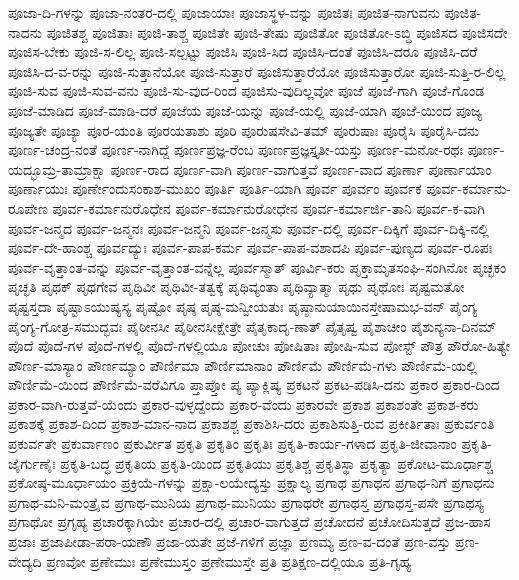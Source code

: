 {ಪೂಜಾ-ದಿ-ಗಳನ್ನು
ಪೂಜಾ-ನಂತರ-ದಲ್ಲಿ
ಪೂಜಾಯಾಃ
ಪೂಜಾಸ್ಥಳ-ವನ್ನು
ಪೂಜಿತಃ
ಪೂಜಿತ-ನಾಗುವನು
ಪೂಜಿತ-ನಾದನು
ಪೂಜಿತಶ್ಚ
ಪೂಜಿತಾಃ
ಪೂಜಿ-ತಾಶ್ಚ
ಪೂಜಿತೇ
ಪೂಜಿ-ತೇಷು
ಪೂಜಿತೋ
ಪೂಜಿತೋ-ಽಬ್ಧಿ
ಪೂಜಿಸದ
ಪೂಜಿಸದೇ
ಪೂಜಿಸ-ಬೇಕು
ಪೂಜಿ-ಸ-ಲಿಲ್ಲ
ಪೂಜಿ-ಸಲ್ಪಟ್ಟು
ಪೂಜಿಸಿ
ಪೂಜಿ-ಸಿದ
ಪೂಜಿಸಿ-ದಂತೆ
ಪೂಜಿಸಿ-ದರೂ
ಪೂಜಿಸಿ-ದರೆ
ಪೂಜಿಸಿ-ದ-ವ-ರನ್ನು
ಪೂಜಿ-ಸುತ್ತಾನೆಯೋ
ಪೂಜಿ-ಸುತ್ತಾರೆ
ಪೂಜಿಸುತ್ತಾರೆಯೋ
ಪೂಜಿಸುತ್ತಾರೋ
ಪೂಜಿ-ಸುತ್ತಿ-ರ-ಲಿಲ್ಲ
ಪೂಜಿ-ಸುವ
ಪೂಜಿ-ಸುವ-ವನು
ಪೂಜಿ-ಸು-ವುದ-ರಿಂದ
ಪೂಜಿಸು-ವುದಿಲ್ಲವೋ
ಪೂಜೆ
ಪೂಜೆ-ಗಾಗಿ
ಪೂಜೆ-ಗೊಂಡ
ಪೂಜೆ-ಮಾಡಿದ
ಪೂಜೆ-ಮಾಡಿ-ದರೆ
ಪೂಜೆಯ
ಪೂಜೆ-ಯನ್ನು
ಪೂಜೆ-ಯಲ್ಲಿ
ಪೂಜೆ-ಯಾಗಿ
ಪೂಜೆ-ಯಿಂದ
ಪೂಜ್ಯ
ಪೂಜ್ಯತೇ
ಪೂಜ್ಯಾ
ಪೂರ-ಯಂತಿ
ಪೂರಯತಾಶು
ಪೂರಿ
ಪೂರುಷಸೇವಿ-ತಮ್
ಪೂರುಷಾಃ
ಪೂರೈಸಿ
ಪೂರೈಸಿ-ದನು
ಪೂರ್ಣ-ಚಂದ್ರ-ನಂತೆ
ಪೂರ್ಣ-ನಾಗಿದ್ದೆ
ಪೂರ್ಣಪ್ರಜ್ಞ-ರೆಂಬ
ಪೂರ್ಣಪ್ರಜ್ಞಸ್ತೃತೀ-ಯಸ್ತು
ಪೂರ್ಣ-ಮನೋ-ರಥಃ
ಪೂರ್ಣ-ಯದ್ಭೂಮ್ರ-ತಾಮ್ರಾಕ್ಷಾ
ಪೂರ್ಣ-ರಾದ
ಪೂರ್ಣ-ವಾಗಿ
ಪೂರ್ಣ-ವಾಗುತ್ತವೆ
ಪೂರ್ಣ-ವಾದ
ಪೂರ್ಣಾ
ಪೂರ್ಣಾಯಾಂ
ಪೂರ್ಣಾಯುಃ
ಪೂರ್ಣೇಂದುಸಂಕಾಶ-ಮುಖಂ
ಪೂರ್ತಿ
ಪೂರ್ತಿ-ಯಾಗಿ
ಪೂರ್ವ
ಪೂರ್ವಂ
ಪೂರ್ವಕ
ಪೂರ್ವ-ಕರ್ಮಾನು-ರೂಪೇಣ
ಪೂರ್ವ-ಕರ್ಮಾನುರೊಧೇನ
ಪೂರ್ವ-ಕರ್ಮಾನುರೋಧೇನ
ಪೂರ್ವ-ಕರ್ಮಾರ್ಜಿ-ತಾನಿ
ಪೂರ್ವ-ಕ-ವಾಗಿ
ಪೂರ್ವ-ಜನ್ಮದ
ಪೂರ್ವ-ಜನ್ಮನಃ
ಪೂರ್ವ-ಜನ್ಮನಿ
ಪೂರ್ವ-ಜನ್ಮಸು
ಪೂರ್ವ-ದಲ್ಲಿ
ಪೂರ್ವ-ದಿಕ್ಕಿಗೆ
ಪೂರ್ವ-ದಿಕ್ಕಿ-ನಲ್ಲಿ
ಪೂರ್ವ-ದೇ-ಹಾಂಶ್ಚ
ಪೂರ್ವದ್ಯುಃ
ಪೂರ್ವ-ಪಾಪ-ಕರ್ಮ
ಪೂರ್ವ-ಪಾಪ-ವಶಾದಪಿ
ಪೂರ್ವ-ಪುಣ್ಯದ
ಪೂರ್ವ-ರೂಪಃ
ಪೂರ್ವ-ವೃತ್ತಾಂತ-ವನ್ನು
ಪೂರ್ವ-ವೃತ್ತಾಂತ-ವನ್ನೆಲ್ಲ
ಪೂರ್ವಸ್ಮಾತ್
ಪೂರ್ವಿ-ಕರು
ಪೃಕ್ತಾಮೃತಸಂಘಿ-ಸಂಗಿನೋ
ಪೃಚ್ಛಕಂ
ಪೃಚ್ಛತಿ
ಪೃಥಕ್
ಪೃಥಗೇವ
ಪೃಥಿವೀ
ಪೃಥಿವೀ-ತತ್ವಕ್ಕೆ
ಪೃಥಿವ್ಯಂತಾ
ಪೃಥಿವ್ಯಾತ್ಮಾ
ಪೃಥು
ಪೃಥೋಃ
ಪೃಷ್ಟಮತೋ
ಪೃಷ್ಟಸ್ತದಾ
ಪೃಷ್ಟಾಽಯುಷ್ಯಸ್ಯ
ಪೃಷ್ಟೋ
ಪೃಷ್ಠ
ಪೃಷ್ಠ-ಮನ್ವೀಯತುಃ
ಪೃಷ್ಠಾನುಯಾಯಿನಸ್ತೇಷಾಮಭ-ವನ್
ಪೈಂಗ್ಯ
ಪೈಂಗ್ಯ-ಗೋತ್ರ-ಸಮುದ್ಭವಃ
ಪೈಠೀನಸೀ
ಪೈಠೀನಸೀಕ್ಷೇತ್ರೇ
ಪೈತೃಕಾದೃ-ಣಾತ್
ಪೈತೃಷ್ವ
ಪೈಶಾಚೀಂ
ಪೈಶುನ್ಯನಾ-ದಿನಮ್
ಪೊದೆ
ಪೊದೆ-ಗಳ
ಪೊದೆ-ಗಳಲ್ಲಿ
ಪೊದೆ-ಗಳಲ್ಲಿಯೂ
ಪೋಚುಃ
ಪೋಷಿತಾಃ
ಪೋಷಿ-ಸುವ
ಪೋಸ್ಟ್
ಪೌತ್ರ
ಪೌರೋ-ಹಿತ್ಯೇ
ಪೌರ್ಣ-ಮಾಸ್ಯಾಂ
ಪೌರ್ಣಮ್ಯಾಂ
ಪೌರ್ಣಿಮಾ
ಪೌರ್ಣಿಮಾನಾಂ
ಪೌರ್ಣಿಮೆ
ಪೌರ್ಣಿಮೆ-ಗಳು
ಪೌರ್ಣಿಮೆ-ಯಲ್ಲಿ
ಪೌರ್ಣಿಮೆ-ಯಿಂದ
ಪೌರ್ಣಿಮೆ-ವರೆವಿಗೂ
ಪ್ತಾಪ್ತೋ
ಪ್ಯ
ಪ್ಯಾಕ್ಲಿಷ್ಯ
ಪ್ರಕಟನೆ
ಪ್ರಕಟ-ಪಡಿಸಿ-ದನು
ಪ್ರಕಾರ
ಪ್ರಕಾರ-ದಿಂದ
ಪ್ರಕಾರ-ವಾಗಿ-ರುತ್ತವೆ-ಯೆಂದು
ಪ್ರಕಾರ-ವುಳ್ಳದ್ದೆಂದು
ಪ್ರಕಾರ-ವೆಂದು
ಪ್ರಕಾರವೇ
ಪ್ರಕಾಶ
ಪ್ರಕಾಶಂತೇ
ಪ್ರಕಾಶ-ಕರು
ಪ್ರಕಾಶಕ್ಕೆ
ಪ್ರಕಾಶ-ದಿಂದ
ಪ್ರಕಾಶ-ಮಾನ-ನಾದ
ಪ್ರಕಾಶಶ್ಚ
ಪ್ರಕಾಶಿಸಿ-ದರು
ಪ್ರಕಾಶಿಸುತ್ತಿ-ರುವ
ಪ್ರಕೀರ್ತಿತಾಃ
ಪ್ರಕುರ್ವಂತಿ
ಪ್ರಕುರ್ವತೇ
ಪ್ರಕುರ್ವಾಣಂ
ಪ್ರಕುರ್ವೀತ
ಪ್ರಕೃತಿ
ಪ್ರಕೃತಿಂ
ಪ್ರಕೃತಿಃ
ಪ್ರಕೃತಿ-ಕಾರ್ಯ-ಗಳಾದ
ಪ್ರಕೃತಿ-ಜೀವಾನಾಂ
ಪ್ರಕೃತಿ-ಜೈರ್ಗುಣೈಃ
ಪ್ರಕೃತಿ-ಬದ್ಧ
ಪ್ರಕೃತಿಯ
ಪ್ರಕೃತಿ-ಯಿಂದ
ಪ್ರಕೃತಿಯು
ಪ್ರಕೃತಿಶ್ಚ
ಪ್ರಕೃತಿಸ್ಥಾ
ಪ್ರಕೃತ್ಯಾ
ಪ್ರಕೋಟ-ಮೂರ್ಧಾಶ್ಚ
ಪ್ರಕೋಷ್ಠ-ಮೂರ್ಧಾಯಂ
ಪ್ರಕ್ರಿಯೆ-ಗಳನ್ನು
ಪ್ರಕ್ಷಾ-ಲಯೇದ್ಯಸ್ತು
ಪ್ರಕ್ಷಾಲ್ಯ
ಪ್ರಗಾಥ
ಪ್ರಗಾಥನ
ಪ್ರಗಾಥ-ನಿಗೆ
ಪ್ರಗಾಥನು
ಪ್ರಗಾಥ-ಮನಿ-ಮಂತ್ರೈವ
ಪ್ರಗಾಥ-ಮುನಿಯ
ಪ್ರಗಾಥ-ಮುನಿಯು
ಪ್ರಗಾಥರೇ
ಪ್ರಗಾಥಸ್ತ
ಪ್ರಗಾಥಸ್ತ-ಪಸೇ
ಪ್ರಗಾಥಸ್ಯ
ಪ್ರಗಾಥೋ
ಪ್ರಗೃಹ್ಯ
ಪ್ರಚಾರಕ್ಕಾಗಿಯೇ
ಪ್ರಚಾರ-ದಲ್ಲಿ
ಪ್ರಚಾರ-ವಾಗುತ್ತದೆ
ಪ್ರಚೋದನೆ
ಪ್ರಚೋದಿಸುತ್ತದೆ
ಪ್ರಜ-ಹಾಸ
ಪ್ರಜಾಃ
ಪ್ರಜಾಪೀಡಾ-ಪರಾ-ಯಣೌ
ಪ್ರಜಾ-ಯತೇ
ಪ್ರಜೆ-ಗಳಿಗೆ
ಪ್ರಜ್ಞಾ
ಪ್ರಣಮ್ಯ
ಪ್ರಣ-ವ-ದಂತೆ
ಪ್ರಣ-ವಸ್ತು
ಪ್ರಣ-ವೇದ್ಯದಿ
ಪ್ರಣವೋ
ಪ್ರಣೇಮುಃ
ಪ್ರಣೇಮುಸ್ತಂ
ಪ್ರಣೇಮುಸ್ತೇ
ಪ್ರತಿ
ಪ್ರತಿಕ್ಷಣ-ದಲ್ಲಿಯೂ
ಪ್ರತಿ-ಗೃಹ್ಯ
}
